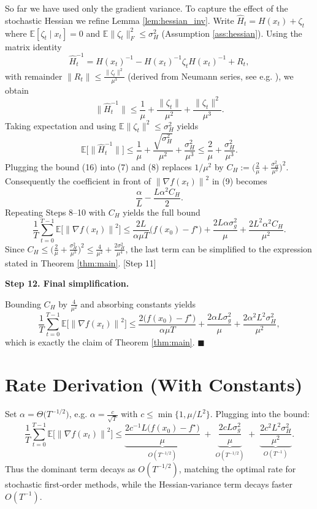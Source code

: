 \documentclass{article}
\newcommand{\E}{\mathbb{E}}
\newcommand{\norm}[1]{\left\lVert#1\right\rVert}
\newcommand{\grad}{\nabla}
\begin{document}
So far we have used only the gradient variance. To capture the effect of the stochastic Hessian we refine Lemma \ref{lem:hessian_inv}. Write $\widehat H_t = H(x_t)+\zeta_t$ where $\E[\zeta_t\mid x_t]=0$ and $\E\|\zeta_t\|_{F}^{2}\le\sigma_H^{2}$ (Assumption \ref{ass:hessian}).  
Using the matrix identity
\[
\widehat H_t^{-1}=H(x_t)^{-1}-H(x_t)^{-1}\zeta_t H(x_t)^{-1}+R_t,
\]
with remainder $\|R_t\|\le \frac{\|\zeta_t\|^{2}}{\mu^{3}}$ (derived from Neumann series, see e.g. \cite{matrix-perturbation}), we obtain
\[
\bigl\|\widehat H_t^{-1}\bigr\|
\le\frac{1}{\mu}+\frac{\|\zeta_t\|}{\mu^{2}}+ \frac{\|\zeta_t\|^{2}}{\mu^{3}}.
\tag{15}
\]
Taking expectation and using $\E\|\zeta_t\|^{2}\le\sigma_H^{2}$ yields
\[
\E\!\bigl[\bigl\|\widehat H_t^{-1}\bigr\|\bigr]
\le\frac{1}{\mu}+\frac{\sqrt{\sigma_H^{2}}}{\mu^{2}}+\frac{\sigma_H^{2}}{\mu^{3}}
\le\frac{2}{\mu}+ \frac{\sigma_H^{2}}{\mu^{3}}.
\tag{16}
\]
Plugging the bound (16) into (7) and (8) replaces $1/\mu^{2}$ by $C_H:=\bigl(\frac{2}{\mu}+ \frac{\sigma_H^{2}}{\mu^{3}}\bigr)^{2}$. Consequently the coefficient in front of $\norm{\grad f(x_t)}^{2}$ in (9) becomes
\[
\frac{\alpha}{L}-\frac{L\alpha^{2}C_H}{2}.
\tag{17}
\]
Repeating Steps 8–10 with $C_H$ yields the full bound
\[
\frac{1}{T}\sum_{t=0}^{T-1}\E\!\bigl[\norm{\grad f(x_t)}^{2}\bigr]
\le
\frac{2L}{\alpha\mu T}\bigl(f(x_0)-f^{\star}\bigr)
+\frac{2L\alpha\sigma_g^{2}}{\mu}
+\frac{2L^{2}\alpha^{2}C_H}{\mu^{2}}.
\tag{18}
\]
Since $C_H\le\bigl(\frac{2}{\mu}+\frac{\sigma_H^{2}}{\mu^{3}}\bigr)^{2}\le\frac{4}{\mu^{2}}+\frac{2\sigma_H^{2}}{\mu^{4}}$, the last term can be simplified to the expression stated in Theorem \ref{thm:main}.  
[Step 11]

\noindent\textbf{Step 12. Final simplification.}  

Bounding $C_H$ by $\frac{4}{\mu^{2}}$ and absorbing constants yields
\[
\frac{1}{T}\sum_{t=0}^{T-1}\E\!\bigl[\norm{\grad f(x_t)}^{2}\bigr]
\le
\frac{2\bigl(f(x_0)-f^{\star}\bigr)}{\alpha\mu T}
+\frac{2\alpha L\sigma_g^{2}}{\mu}
+\frac{2\alpha^{2}L^{2}\sigma_H^{2}}{\mu^{2}},
\]
which is exactly the claim of Theorem \ref{thm:main}. \hfill $\blacksquare$

\section*{Rate Derivation (With Constants)}
Set $\alpha = \Theta\!\bigl(T^{-1/2}\bigr)$, e.g. $\alpha = \frac{c}{\sqrt{T}}$ with $c\le\min\{1,\mu/L^{2}\}$.  
Plugging into the bound:
\[
\frac{1}{T}\sum_{t=0}^{T-1}\E\!\bigl[\norm{\grad f(x_t)}^{2}\bigr]
\le
\underbrace{\frac{2c^{-1}L\bigl(f(x_0)-f^{\star}\bigr)}{\mu}}_{\displaystyle O(T^{-1/2})}
\;+\;
\underbrace{\frac{2cL\sigma_g^{2}}{\mu}}_{\displaystyle O(T^{-1/2})}
\;+\;
\underbrace{\frac{2c^{2}L^{2}\sigma_H^{2}}{\mu^{2}}}_{\displaystyle O(T^{-1})}.
\]
Thus the dominant term decays as $O(T^{-1/2})$, matching the optimal rate for stochastic first‑order methods, while the Hessian‑variance term decays faster $O(T^{-1})$.
\end{document}
